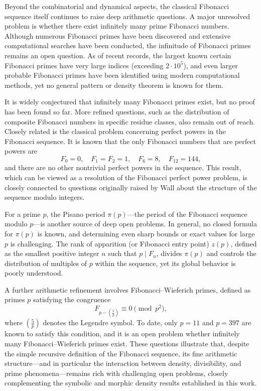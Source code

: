 \documentclass[12pt, a4paper]{article}
\begin{document}
Beyond the combinatorial and dynamical aspects, the classical Fibonacci sequence itself continues to raise deep arithmetic questions. A major unresolved problem is whether there exist infinitely many prime Fibonacci numbers. Although numerous Fibonacci primes have been discovered and extensive computational searches have been conducted, the infinitude of Fibonacci primes remains an open question. As of recent records, the largest known certain Fibonacci primes have very large indices (exceeding $2\cdot 10^5$), and even larger probable Fibonacci primes have been identified using modern computational methods, yet no general pattern or density theorem is known for them.

It is widely conjectured that infinitely many Fibonacci primes exist, but no proof has been found so far. More refined questions, such as the distribution of composite Fibonacci numbers in specific residue classes, also remain out of reach. Closely related is the classical problem concerning perfect powers in the Fibonacci sequence. It is known that the only Fibonacci numbers that are perfect powers are
\[
F_0 = 0,\quad F_1 = F_2 = 1,\quad F_6 = 8,\quad F_{12} = 144,
\]
and there are no other nontrivial perfect powers in the sequence. This result, which can be viewed as a resolution of the Fibonacci perfect power problem, is closely connected to questions originally raised by Wall about the structure of the sequence modulo integers.

For a prime $p$, the Pisano period $\pi(p)$—the period of the Fibonacci sequence modulo $p$—is another source of deep open problems. In general, no closed formula for $\pi(p)$ is known, and determining even sharp bounds or exact values for large $p$ is challenging. The rank of apparition (or Fibonacci entry point) $z(p)$, defined as the smallest positive integer $n$ such that $p \mid F_n$, divides $\pi(p)$ and controls the distribution of multiples of $p$ within the sequence, yet its global behavior is poorly understood.

A further arithmetic refinement involves Fibonacci–Wieferich primes, defined as primes $p$ satisfying the congruence
\[
F_{p - \left(\frac{5}{p}\right)} \equiv 0 \pmod{p^2},
\]
where $\left(\frac{5}{p}\right)$ denotes the Legendre symbol. To date, only $p = 11$ and $p = 397$ are known to satisfy this condition, and it is an open problem whether infinitely many Fibonacci–Wieferich primes exist. These questions illustrate that, despite the simple recursive definition of the Fibonacci sequence, its fine arithmetic structure—and in particular the interaction between density, divisibility, and prime phenomena—remains rich with challenging open problems, closely complementing the symbolic and morphic density results established in this work.
\end{document}
